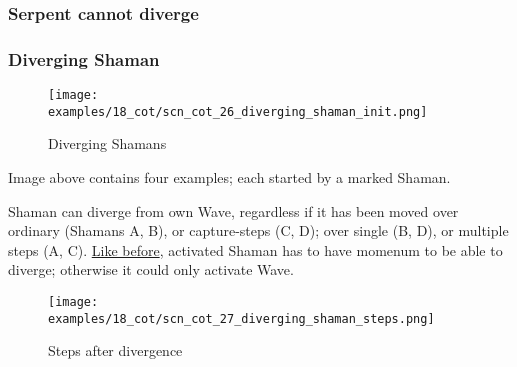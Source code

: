 \clearpage %

\subsubsection*{Serpent cannot diverge}
\label{sec:Conquest of Tlalocan/Shaman/Divergence/Serpent cannot diverge}

\TODO

\clearpage %

\subsubsection*{Diverging Shaman}
\label{sec:Conquest of Tlalocan/Shaman/Movement/Diverging Shaman}

\vspace*{-1.4\baselineskip}
\noindent
\begin{figure}[!h]
\texttt{[image: examples/18\_cot/scn\_cot\_26\_diverging\_shaman\_init.png]}
\vspace*{-1.3\baselineskip}
\caption{Diverging Shamans}
\label{fig:scn_cot_26_diverging_shaman_init}
\end{figure}

\vspace*{-0.4\baselineskip}
Image above contains four examples; each started by a marked Shaman.

Shaman can diverge from own Wave, regardless if it has been moved over ordinary
(Shamans A, B), or capture-steps (C, D); over single (B, D), or multiple steps (A, C).
\hyperref[fig:scn_cot_17_diverging_activated_piece_init]{Like before}, activated
Shaman has to have momenum to be able to diverge; otherwise it could only activate
Wave.

\clearpage %

\vspace*{-2.1\baselineskip}
\noindent
\begin{figure}[!h]
\texttt{[image: examples/18\_cot/scn\_cot\_27\_diverging\_shaman\_steps.png]}
\vspace*{-1.3\baselineskip}
\caption{Steps after divergence}
\label{fig:scn_cot_27_diverging_shaman_steps}
\end{figure}

